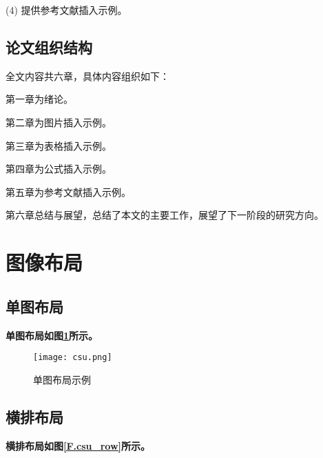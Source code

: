 (4) 提供参考文献插入示例。

\subsection{论文组织结构}

全文内容共六章，具体内容组织如下：

第一章为绪论。

第二章为图片插入示例。

第三章为表格插入示例。

第四章为公式插入示例。

第五章为参考文献插入示例。

第六章总结与展望，总结了本文的主要工作，展望了下一阶段的研究方向。

\newpage

\section{图像布局}


\subsection{单图布局}



\textbf{单图布局如图\ref{F.csu_single}所示。}

\begin{figure}[hbt]
\centering
\texttt{[image: csu.png]}
\caption{单图布局示例}
\label{F.csu_single}
\end{figure}

\subsection{横排布局}

\textbf{横排布局如图\ref{F.csu_row}所示。}

